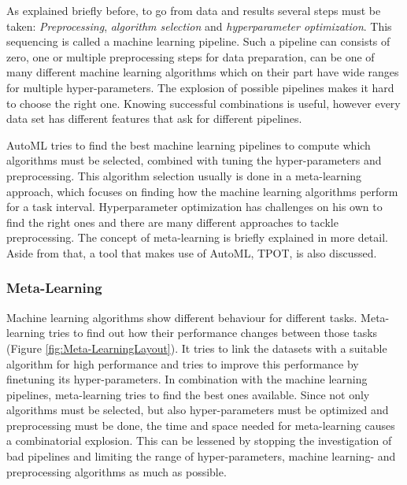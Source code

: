 \documentclass[10pt,a4paper]{report}
\begin{document}
	As explained briefly before, to go from data and results several steps must be taken: \textit{Preprocessing}, \textit{algorithm selection} and \textit{hyperparameter optimization}. This sequencing is called a machine learning pipeline. Such a pipeline can consists of zero, one or multiple preprocessing steps for data preparation, can be one of many different machine learning algorithms which on their part have wide ranges for multiple hyper-parameters. The explosion of possible pipelines makes it hard to choose the right one. Knowing successful combinations is useful, however every data set has different features that ask for different pipelines\cite{Gijsbers2017Thesis}.
	
	AutoML tries to find the best machine learning pipelines to compute which algorithms must be selected, combined with tuning the hyper-parameters and preprocessing. This algorithm selection usually is done in a meta-learning approach, which focuses on finding how the machine learning algorithms perform for a task interval. Hyperparameter optimization has challenges on his own to find the right ones and there are many different approaches to tackle preprocessing. The concept of meta-learning is briefly explained in more detail. Aside from that, a tool that makes use of AutoML, TPOT, is also discussed. 	
	
	
	\subsubsection{Meta-Learning}
	\label{FSsubsec:Meta-Learning}
	
	Machine learning algorithms show different behaviour for different tasks. Meta-learning tries to find out how their performance changes between those tasks (Figure \ref{fig:Meta-LearningLayout}). It tries to link the datasets with a suitable algorithm for high performance and tries to improve this performance by finetuning its hyper-parameters. In combination with the machine learning pipelines, meta-learning tries to find the best ones available. Since not only algorithms must be selected, but also hyper-parameters must be optimized and preprocessing must be done, the time and space needed for meta-learning causes a combinatorial explosion. This can be lessened by stopping the investigation of bad pipelines and limiting the range of hyper-parameters, machine learning- and preprocessing algorithms as much as possible. 
	
\end{document}
